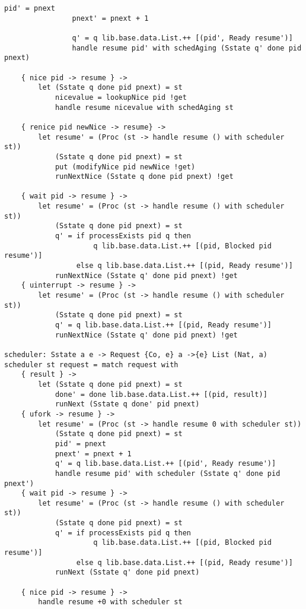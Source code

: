 \documentclass[logo,bsc,singlespacing,parskip]{infthesis}
\begin{document}
\begin{lstlisting}[language=unison]
                pid' = pnext
                pnext' = pnext + 1

                q' = q lib.base.data.List.++ [(pid', Ready resume')]
                handle resume pid' with schedAging (Sstate q' done pid pnext)

    { nice pid -> resume } ->
        let (Sstate q done pid pnext) = st
            nicevalue = lookupNice pid !get
            handle resume nicevalue with schedAging st

    { renice pid newNice -> resume} -> 
        let resume' = (Proc (st -> handle resume () with scheduler st))
            (Sstate q done pid pnext) = st
            put (modifyNice pid newNice !get)
            runNextNice (Sstate q done pid pnext) !get
    
    { wait pid -> resume } ->
        let resume' = (Proc (st -> handle resume () with scheduler st))
            (Sstate q done pid pnext) = st
            q' = if processExists pid q then
                     q lib.base.data.List.++ [(pid, Blocked pid resume')]
                 else q lib.base.data.List.++ [(pid, Ready resume')]
            runNextNice (Sstate q' done pid pnext) !get
    { uinterrupt -> resume } ->
        let resume' = (Proc (st -> handle resume () with scheduler st))
            (Sstate q done pid pnext) = st
            q' = q lib.base.data.List.++ [(pid, Ready resume')]
            runNextNice (Sstate q' done pid pnext) !get

scheduler: Sstate a e -> Request {Co, e} a ->{e} List (Nat, a)
scheduler st request = match request with 
    { result } -> 
        let (Sstate q done pid pnext) = st 
            done' = done lib.base.data.List.++ [(pid, result)]
            runNext (Sstate q done' pid pnext)
    { ufork -> resume } -> 
        let resume' = (Proc (st -> handle resume 0 with scheduler st))
            (Sstate q done pid pnext) = st
            pid' = pnext
            pnext' = pnext + 1
            q' = q lib.base.data.List.++ [(pid', Ready resume')]
            handle resume pid' with scheduler (Sstate q' done pid pnext')
    { wait pid -> resume } -> 
        let resume' = (Proc (st -> handle resume () with scheduler st))
            (Sstate q done pid pnext) = st
            q' = if processExists pid q then
                     q lib.base.data.List.++ [(pid, Blocked pid resume')]
                 else q lib.base.data.List.++ [(pid, Ready resume')]
            runNext (Sstate q' done pid pnext)

    { nice pid -> resume } ->
        handle resume +0 with scheduler st


\end{lstlisting}
\end{document}
